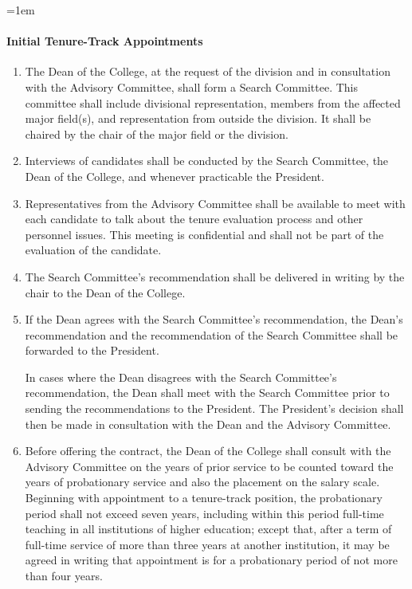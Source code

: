 \documentclass{manual}
\let\oldparagraph\paragraph
\renewcommand\paragraph{\leftskip=1em\oldparagraph}
\newcommand{\itemLevelA}{\alph*.}
\newcommand{\itemRefA}{\alph*}
\begin{document}
\paragraph{Initial Tenure-Track Appointments}\label{par:InitialTenureTrackAppointments}
\begin{enumerate}[label=\itemLevelA,ref=\itemRefA]

\item The Dean of the College, at the request of the division and in consultation with the Advisory Committee, shall form a Search Committee. This committee shall include divisional representation, members from the affected major field(s), and representation from outside the division. It shall be chaired by the chair of the major field or the division.

\item Interviews of candidates shall be conducted by the Search Committee, the Dean of the College, and whenever practicable the President.

\item Representatives from the Advisory Committee shall be available to meet with each candidate to talk about the tenure evaluation process and other personnel issues. This meeting is confidential and shall not be part of the evaluation of the candidate.

\item The Search Committee's recommendation shall be delivered in writing by the chair to the Dean of the College.

\item If the Dean agrees with the Search Committee's recommendation, the Dean's recommendation and the recommendation of the Search Committee shall be forwarded to the President.

In cases where the Dean disagrees with the Search Committee's recommendation, the Dean shall meet with the Search Committee prior to sending the recommendations to the President. The President's decision shall then be made in consultation with the Dean and the Advisory Committee.

\item Before offering the contract, the Dean of the College shall consult with the Advisory Committee on the years of prior service to be counted toward the years of probationary service and also the placement on the salary scale. Beginning with appointment to a tenure-track position, the probationary period shall not exceed seven years, including within this period full-time teaching in all institutions of higher education; except that, after a term of full-time service of more than three years at another institution, it may be agreed in writing that appointment is for a probationary period of not more than four years.


\end{enumerate}
\end{document}
